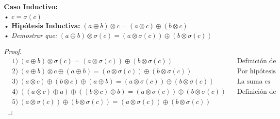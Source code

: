 \documentclass[11pt,letterpaper]{article}
\begin{document}
\begin{enumerate}
\vspace{0.1cm}

\noindent \textbf{\large Caso Inductivo:}\\
\noindent • $c=\sigma(c)$ \\
\noindent • \textbf{Hipótesis Inductiva: } $(a\oplus b)\otimes c = (a\otimes c) \oplus (b \otimes c)$ \\
\noindent • \emph{Demostrar que:} $(a\oplus b)\otimes \sigma(c) = (a\otimes \sigma(c)) \oplus (b \otimes \sigma(c))$

\begin{proof}
\begin{align*}
&1)\ (a\oplus b)\otimes \sigma(c) = (a\otimes \sigma(c)) \oplus (b \otimes \sigma(c)) && \text{Definición de la multiplicación.} \\
&2)\ (a \oplus b) \otimes c \oplus (a \oplus b) = (a\otimes \sigma(c)) \oplus (b \otimes \sigma(c)) && \text{Por hipótesis inductiva.} \\
&3)\ (a \otimes c) \oplus (b \otimes c) \oplus (a \oplus b) = (a\otimes \sigma(c)) \oplus (b \otimes \sigma(c)) && \text{La suma es conmutativa.} \\
&4)\ ((a \otimes c) \oplus a) \oplus ((b \otimes c) \oplus b) = (a\otimes \sigma(c)) \oplus (b \otimes \sigma(c)) && \text{Definición de la multiplicación.} \\
&5)\ (a \otimes \sigma(c)) \oplus (b \otimes \sigma(c)) = (a\otimes \sigma(c)) \oplus (b \otimes \sigma(c))
\end{align*}
\end{proof}

\end{enumerate}
\end{document}

